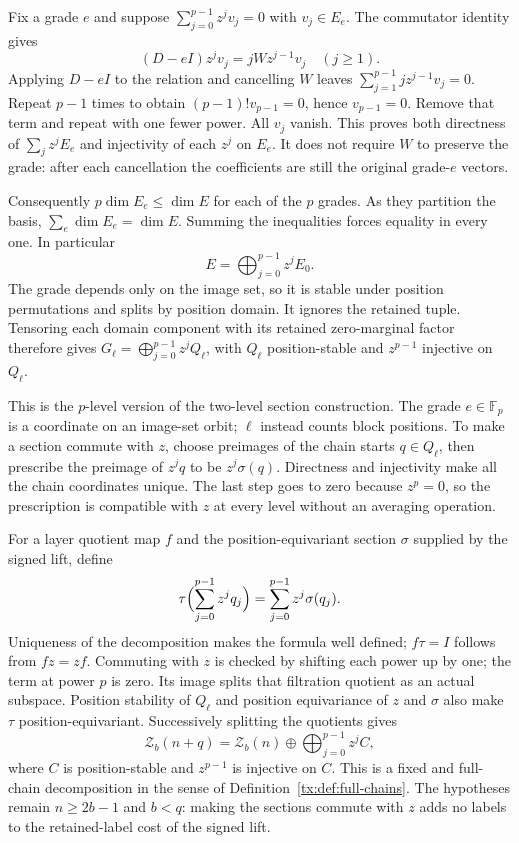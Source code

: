 Fix a grade $e$ and suppose $\sum_{j=0}^{p-1}z^jv_j=0$ with
$v_j\in E_e$. The commutator identity gives
\[
 (D-eI)z^jv_j=jWz^{j-1}v_j\quad(j\ge1).
\]
Applying $D-eI$ to the relation and cancelling $W$ leaves
$\sum_{j=1}^{p-1}jz^{j-1}v_j=0$. Repeat $p-1$ times to obtain
$(p-1)!v_{p-1}=0$, hence $v_{p-1}=0$. Remove that term and repeat
with one fewer power. All $v_j$ vanish. This proves both directness
of $\sum_jz^jE_e$ and injectivity of each $z^j$ on $E_e$.
It does not require $W$ to preserve the grade: after each cancellation
the coefficients are still the original grade-$e$ vectors.

Consequently $p\dim E_e\le\dim E$ for each of the $p$ grades.
As they partition the basis, $\sum_e\dim E_e=\dim E$. Summing the
inequalities forces equality in every one. In particular
\[
                   E=\bigoplus_{j=0}^{p-1}z^jE_0.
\]
The grade depends only on the image set, so it is stable under
position permutations and splits by position domain. It ignores the
retained tuple. Tensoring each domain component with its retained
zero-marginal factor therefore gives
$G_\ell=\bigoplus_{j=0}^{p-1}z^jQ_\ell$, with $Q_\ell$
position-stable and $z^{p-1}$ injective on $Q_\ell$.

This is the $p$-level version of the two-level section construction.
The grade $e\in\mathbb F_p$ is a coordinate on an image-set orbit;
$\ell$ instead counts block positions. To make a section commute
with $z$, choose preimages of the chain starts $q\in Q_\ell$,
then prescribe the preimage of $z^jq$ to be $z^j\sigma(q)$.
Directness and injectivity make all the chain coordinates unique.
The last step goes to zero because $z^p=0$, so the prescription
is compatible with $z$ at every level without an averaging operation.

For a layer quotient map $f$ and the position-equivariant section
$\sigma$ supplied by the signed lift, define
\[
 \tau\Bigl(\sum_{j=0}^{p-1}z^jq_j\Bigr)
                  =\sum_{j=0}^{p-1}z^j\sigma(q_j).
\]
Uniqueness of the decomposition makes the formula well defined;
$f\tau=I$ follows from $fz=zf$. Commuting with $z$ is checked by
shifting each power up by one; the term at power $p$ is zero.
Its image splits that filtration quotient as an actual subspace.
Position stability of $Q_\ell$ and position equivariance of $z$ and
$\sigma$ also make $\tau$ position-equivariant.
Successively splitting the quotients gives
\begin{equation}\label{tx:eq:socsplitp}
\mathcal Z_b(n+q)=\mathcal Z_b(n)\oplus\bigoplus_{j=0}^{p-1}z^jC,
\end{equation}
where $C$ is position-stable and $z^{p-1}$ is injective on $C$.
This is a fixed and full-chain decomposition in the sense of
Definition~\ref{tx:def:full-chains}. The hypotheses remain
$n\ge2b-1$ and $b<q$: making the sections commute with $z$ adds no
labels to the retained-label cost of the signed lift.

